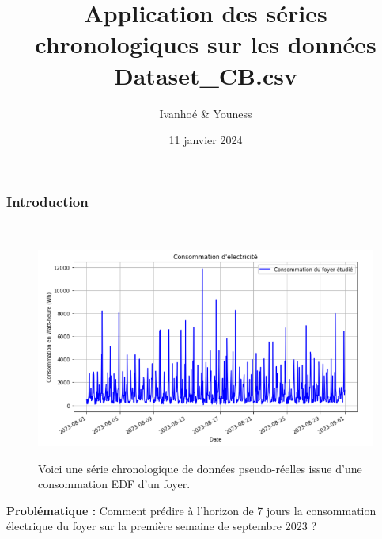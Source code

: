 \documentclass{beamer}
\title{Application des séries chronologiques sur les données Dataset\_CB.csv}
\author{Ivanhoé \& Youness}
\date{11 janvier 2024}
\theoremstyle{definition}
\begin{document}
\begin{frame}[plain]
    \maketitle
\end{frame}


\begin{frame}
\frametitle{Introduction}
\hfill\\[-0.75cm]
\begin{figure}
	\centering
	\includegraphics[scale=0.35]{1.png}\\[-0.25cm]
	\caption*{Voici une série chronologique de données pseudo-réelles issue d'une consommation EDF d'un foyer.}
\end{figure}

\textcolor{modernvert}{\textbf{Problématique :}} Comment prédire à l'horizon de 7 jours la
consommation électrique du foyer sur la première semaine de septembre 2023 ?
\end{frame}

\begin{frame}
	\tableofcontents
\end{frame}
\end{document}
